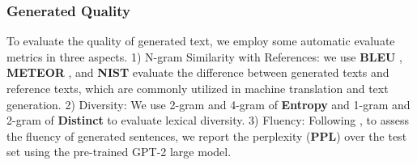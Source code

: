 \documentclass[11pt]{article}
\begin{document}
\subsubsection{Generated Quality} To evaluate the quality of generated text, we employ some automatic evaluate metrics in three aspects. 1) N-gram Similarity with References: we use \textbf{
BLEU} \cite{papineni2002bleu}, \textbf{METEOR} \cite{lavie2007meteor}, and \textbf{NIST} \cite{doddington2002automatic} evaluate the difference between generated texts and reference texts, which are commonly utilized in machine translation and text generation. 2) Diversity: We use 2-gram and 4-gram of \textbf{Entropy} \cite{zhang2018generating} and 1-gram and 2-gram of \textbf{Distinct} \cite{li2015diversity} to evaluate lexical diversity. 3) Fluency: Following \citet{zhang2020pointer, mcmc-xlnet}, to assess the fluency of generated sentences, we report the perplexity (\textbf{PPL}) over the test set using the pre-trained GPT-2 \cite{radford2019language} large model.
\end{document}
